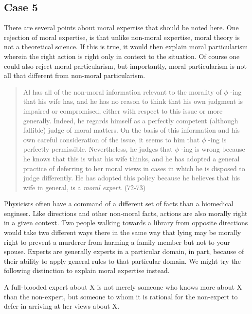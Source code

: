 \documentclass[phdthesis,12pt,final,a4paper]{wuthesis}
\theoremstyle{definition}
\theoremstyle{definition}
\theoremstyle{definition}
\theoremstyle{definition}
\theoremstyle{remark}
\begin{document}
\subsection*{Case 5}\label{case-5}

There are several points about moral expertise that should be noted here. One rejection of moral expertise, is that unlike non-moral expertise, moral theory is not a theoretical science. If this is true, it would then explain moral particularism wherein the right action is right only in context to the situation. Of course one could also reject moral particularism, but importantly, moral particularism is not all that different from non-moral particularism.

\begin{quote}
Al has all of the non-moral information relevant to the morality of \(\phi\) -ing that his wife has, and he has no reason to think that his own judgment is impaired or compromised, either with respect to this issue or more generally. Indeed, he regards himself as a perfectly competent (although fallible) judge of moral matters. On the basis of this information and his own careful consideration of the issue, it seems to him that \(\phi\) -ing is perfectly permissible. Nevertheless, he judges that \(\phi\) -ing is wrong because he knows that this is what his wife thinks, and he has adopted a general practice of deferring to her moral views in cases in which he is disposed to judge differently. He has adopted this policy because he believes that his wife in general, is a \emph{moral expert}. (72-73)
\end{quote}

Physicists often have a command of a different set of facts than a biomedical engineer. Like directions and other non-moral facts, actions are also morally right in a given context. Two people walking towards a library from opposite directions would take two different ways there in the same way that lying may be morally right to prevent a murderer from harming a family member but not to your spouse. Experts are generally experts in a particular domain, in part, because of their ability to apply general rules to that particular domain. We might try the following distinction to explain moral expertise instead.

A full-blooded expert about X is not merely someone who knows more about X than the non-expert, but someone to whom it is rational for the non-expert to defer in arriving at her views about X.
\end{document}
